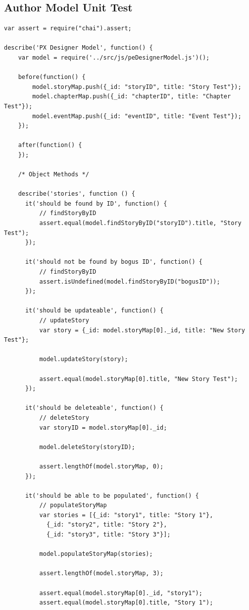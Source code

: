 \documentclass[12pt]{ucthesis}
\begin{document}
\subsection{Author Model Unit Test}
\begin{lstlisting}
var assert = require("chai").assert;

describe('PX Designer Model', function() {
    var model = require('../src/js/peDesignerModel.js')();

    before(function() {
        model.storyMap.push({_id: "storyID", title: "Story Test"});
        model.chapterMap.push({_id: "chapterID", title: "Chapter Test"});
        model.eventMap.push({_id: "eventID", title: "Event Test"});
    });
    
    after(function() {
    });

    /* Object Methods */

    describe('stories', function () {
      it('should be found by ID', function() {
          // findStoryByID
          assert.equal(model.findStoryByID("storyID").title, "Story Test");
      });
      
      it('should not be found by bogus ID', function() {
          // findStoryByID
          assert.isUndefined(model.findStoryByID("bogusID")); 
      });

      it('should be updateable', function() {
          // updateStory
          var story = {_id: model.storyMap[0]._id, title: "New Story Test"};

          model.updateStory(story);

          assert.equal(model.storyMap[0].title, "New Story Test");
      });

      it('should be deleteable', function() {
          // deleteStory
          var storyID = model.storyMap[0]._id;

          model.deleteStory(storyID);

          assert.lengthOf(model.storyMap, 0);
      });

      it('should be able to be populated', function() {
          // populateStoryMap
          var stories = [{_id: "story1", title: "Story 1"}, 
            {_id: "story2", title: "Story 2"}, 
            {_id: "story3", title: "Story 3"}];

          model.populateStoryMap(stories);

          assert.lengthOf(model.storyMap, 3);

          assert.equal(model.storyMap[0]._id, "story1");
          assert.equal(model.storyMap[0].title, "Story 1");


\end{lstlisting}
\end{document}
